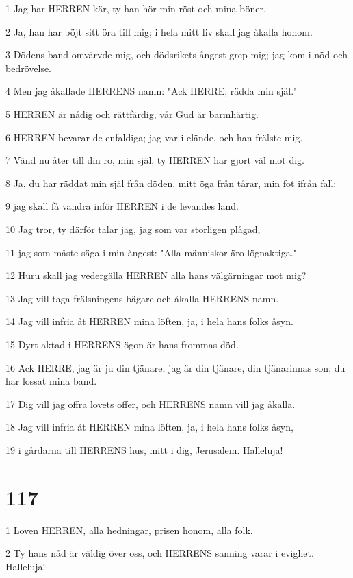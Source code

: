 \par 1 Jag har HERREN kär, ty han hör min röst och mina böner.
\par 2 Ja, han har böjt sitt öra till mig; i hela mitt liv skall jag åkalla honom.
\par 3 Dödens band omvärvde mig, och dödsrikets ångest grep mig; jag kom i nöd och bedrövelse.
\par 4 Men jag åkallade HERRENS namn: "Ack HERRE, rädda min själ."
\par 5 HERREN är nådig och rättfärdig, vår Gud är barmhärtig.
\par 6 HERREN bevarar de enfaldiga; jag var i elände, och han frälste mig.
\par 7 Vänd nu åter till din ro, min själ, ty HERREN har gjort väl mot dig.
\par 8 Ja, du har räddat min själ från döden, mitt öga från tårar, min fot ifrån fall;
\par 9 jag skall få vandra inför HERREN i de levandes land.
\par 10 Jag tror, ty därför talar jag, jag som var storligen plågad,
\par 11 jag som måste säga i min ångest: "Alla människor äro lögnaktiga."
\par 12 Huru skall jag vedergälla HERREN alla hans välgärningar mot mig?
\par 13 Jag vill taga frälsningens bägare och åkalla HERRENS namn.
\par 14 Jag vill infria åt HERREN mina löften, ja, i hela hans folks åsyn.
\par 15 Dyrt aktad i HERRENS ögon är hans frommas död.
\par 16 Ack HERRE, jag är ju din tjänare, jag är din tjänare, din tjänarinnas son; du har lossat mina band.
\par 17 Dig vill jag offra lovets offer, och HERRENS namn vill jag åkalla.
\par 18 Jag vill infria åt HERREN mina löften, ja, i hela hans folks åsyn,
\par 19 i gårdarna till HERRENS hus, mitt i dig, Jerusalem. Halleluja!

\chapter{117}

\par 1 Loven HERREN, alla hedningar, prisen honom, alla folk.
\par 2 Ty hans nåd är väldig över oss, och HERRENS sanning varar i evighet. Halleluja!


